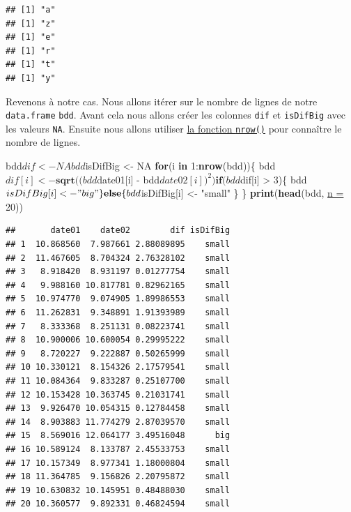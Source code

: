 \documentclass[twoside,symmetric]{book}
\newenvironment{Shaded}{}{}
\newcommand{\ControlFlowTok}[1]{\textbf{#1}}
\newcommand{\DataTypeTok}[1]{\underline{#1}}
\newcommand{\DecValTok}[1]{#1}
\newcommand{\KeywordTok}[1]{\textbf{#1}}
\newcommand{\NormalTok}[1]{#1}
\newcommand{\OperatorTok}[1]{#1}
\newcommand{\OtherTok}[1]{#1}
\newcommand{\StringTok}[1]{#1}
\begin{document}
\begin{verbatim}
## [1] "a"
## [1] "z"
## [1] "e"
## [1] "r"
## [1] "t"
## [1] "y"
\end{verbatim}

Revenons à notre cas. Nous allons itérer sur le nombre de lignes de notre \texttt{data.frame} \texttt{bdd}. Avant cela nous allons créer les colonnes \texttt{dif} et \texttt{isDifBig} avec les valeurs \texttt{NA}. Ensuite nous allons utiliser \protect\hyperlink{l015nrow}{la fonction \texttt{nrow()}} pour connaître le nombre de lignes.

\begin{Shaded}
\begin{Highlighting}[]
\NormalTok{bdd}\OperatorTok{$}\NormalTok{dif <-}\StringTok{ }\OtherTok{NA}
\NormalTok{bdd}\OperatorTok{$}\NormalTok{isDifBig <-}\StringTok{ }\OtherTok{NA}
\ControlFlowTok{for}\NormalTok{(i }\ControlFlowTok{in} \DecValTok{1}\OperatorTok{:}\KeywordTok{nrow}\NormalTok{(bdd))\{}
\NormalTok{  bdd}\OperatorTok{$}\NormalTok{dif[i] <-}\StringTok{ }\KeywordTok{sqrt}\NormalTok{((bdd}\OperatorTok{$}\NormalTok{date01[i] }\OperatorTok{-}\StringTok{ }\NormalTok{bdd}\OperatorTok{$}\NormalTok{date02[i])}\OperatorTok{^}\DecValTok{2}\NormalTok{)}
  \ControlFlowTok{if}\NormalTok{(bdd}\OperatorTok{$}\NormalTok{dif[i] }\OperatorTok{>}\StringTok{ }\DecValTok{3}\NormalTok{)\{}
\NormalTok{    bdd}\OperatorTok{$}\NormalTok{isDifBig[i] <-}\StringTok{ "big"}
\NormalTok{  \}}\ControlFlowTok{else}\NormalTok{\{}
\NormalTok{    bdd}\OperatorTok{$}\NormalTok{isDifBig[i] <-}\StringTok{ "small"}
\NormalTok{  \}}
\NormalTok{\}}
\KeywordTok{print}\NormalTok{(}\KeywordTok{head}\NormalTok{(bdd, }\DataTypeTok{n =} \DecValTok{20}\NormalTok{))}
\end{Highlighting}
\end{Shaded}

\begin{verbatim}
##       date01    date02        dif isDifBig
## 1  10.868560  7.987661 2.88089895    small
## 2  11.467605  8.704324 2.76328102    small
## 3   8.918420  8.931197 0.01277754    small
## 4   9.988160 10.817781 0.82962165    small
## 5  10.974770  9.074905 1.89986553    small
## 6  11.262831  9.348891 1.91393989    small
## 7   8.333368  8.251131 0.08223741    small
## 8  10.900006 10.600054 0.29995222    small
## 9   8.720227  9.222887 0.50265999    small
## 10 10.330121  8.154326 2.17579541    small
## 11 10.084364  9.833287 0.25107700    small
## 12 10.153428 10.363745 0.21031741    small
## 13  9.926470 10.054315 0.12784458    small
## 14  8.903883 11.774279 2.87039570    small
## 15  8.569016 12.064177 3.49516048      big
## 16 10.589124  8.133787 2.45533753    small
## 17 10.157349  8.977341 1.18000804    small
## 18 11.364785  9.156826 2.20795872    small
## 19 10.630832 10.145951 0.48488030    small
## 20 10.360577  9.892331 0.46824594    small
\end{verbatim}
\end{document}
